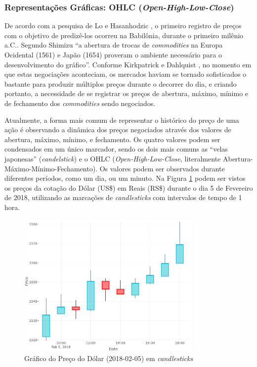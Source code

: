 \documentclass[12pt]{article}
\begin{document}
\subsubsection{Representações Gráficas: OHLC (\textit{Open-High-Low-Close})} \label{sec:OHLC}

De acordo com a pesquisa de Lo e Hasanhodzic \cite{LoHasanhodzic:2010}, o primeiro registro
de preços com o objetivo de predizê-los ocorreu na Babilônia, durante o primeiro milênio a.C..
Segundo Shimizu \cite{Shimizu:1986} ``a abertura de trocas de \textit{commodities} na
Europa Ocidental (1561) e Japão (1654) proveram o ambiente necessário para o desenvolvimento
do gráfico''. Conforme Kirkpatrick e Dahlquist \cite{KirkpatrickDahlquist:2006},
no momento em que estas negociações aconteciam, os mercados haviam se tornado sofisticados
o bastante para produzir múltiplos preços durante o decorrer do dia, e criando portanto,
a necessidade de se registrar os preços de abertura, máximo, mínimo e de fechamento dos
\textit{commodities} sendo negociados.

Atualmente, a forma mais comum de representar o histórico do preço de uma ação é observando
a dinâmica dos preços negociados através dos valores de abertura, máximo, mínimo, e fechamento.
Os quatro valores podem ser condensados em um único marcador, sendo os dois mais comuns as
``velas japonesas'' (\textit{candelstick}) e o OHLC (\textit{Open-High-Low-Close}, literalmente
Abertura-Máximo-Mínimo-Fechamento). Os valores podem ser observados durante diferentes períodos,
como um dia, ou um minuto. Na Figura \ref{fig:candlestick_chart} podem ser vistos os preços
da cotação do Dólar (US\$) em Reais (RS\$) durante o dia 5 de Fevereiro de 2018, utilizando
as marcações de \textit{candlesticks} com intervalos de tempo de 1 hora.

\begin{figure}[H]
	\centering
	\includegraphics[width=0.8\textwidth]{candlestick_chart.png}
	\caption{Gráfico do Preço do Dólar (2018-02-05) em \textit{candlesticks}}
	\label{fig:candlestick_chart}
\end{figure}
\end{document}
